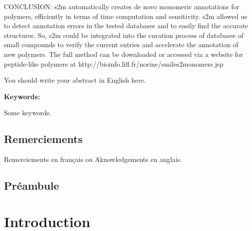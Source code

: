 \documentclass[12pt]{LHSV_thesis}
\begin{document}
CONCLUSION: s2m automatically creates de novo monomeric annotations for polymers, efficiently in terms of time computation and sensitivity.
s2m allowed us to detect annotation errors in the tested databases and to easily find the accurate structures.
So, s2m could be integrated into the curation process of databases of small compounds to verify the current entries and accelerate the annotation of new polymers.
The full method can be downloaded or accessed via a website for peptide-like polymers at http://bioinfo.lifl.fr/norine/smiles2monomers.jsp

You should write your abstract in English here.
\vspace*{28pt}\par
\textbf{Keywords:}\par
Some keywords.
\par
\cleardoublepage

\section*{\Huge Remerciements}
%
\vspace{2cm}

Remerciements en français ou  Aknowledgements en anglais.

\clearpage


\tableofcontents
\clearpage





\section*{Préambule}
\label{preambule}
%


\chapter*{Introduction}
\label{Introduction}
\end{document}
